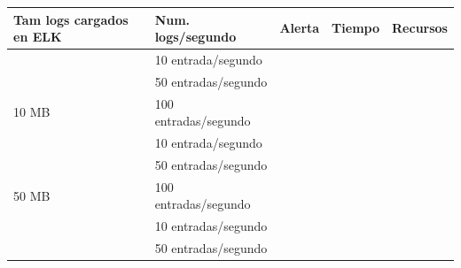 \begin{table}[H]
\begin{tabular}{|l|l|l|l|l|}
\hline
\rowcolor[HTML]{ECF4FF} 
{\color[HTML]{000000} \textbf{Tam logs cargados en ELK}} & {\color[HTML]{000000} \textbf{Num. logs/segundo}} & {\color[HTML]{000000} \textbf{Alerta}} & {\color[HTML]{000000} \textbf{Tiempo}} & {\color[HTML]{000000} \textbf{Recursos}} \\ \hline
                                                         & 10 entrada/segundo                                &                                        &                                        &                                                 \\ \cline{2-5} 
                                                         & 50 entradas/segundo                               &                                        &                                        &                                                 \\ \cline{2-5} 
\multirow{-3}{*}{10 MB}                                  & 100 entradas/segundo                              &                                        &                                        &                                                 \\ \hline
                                                         & 10 entrada/segundo                                &                                        &                                        &                                                 \\ \cline{2-5} 
                                                         & 50 entradas/segundo                               &                                        &                                        &                                                 \\ \cline{2-5} 
\multirow{-3}{*}{50 MB}                                  & 100 entradas/segundo                              &                                        &                                        &                                                 \\ \hline
                                                         & 10 entradas/segundo                               &                                        &                                        &                                                 \\ \cline{2-5} 
                                                         & 50 entradas/segundo                               &                                        &                                        &                                                 \\ \cline{2-5} 

\end{tabular}
\end{table}
